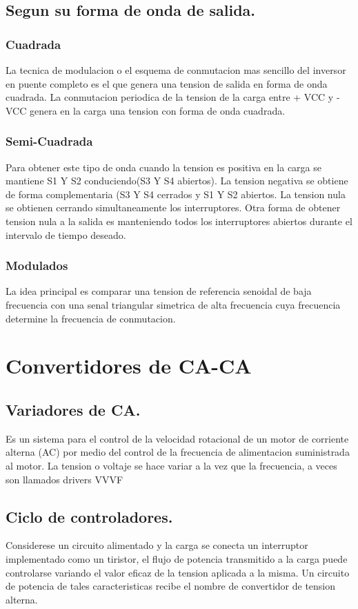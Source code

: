 \documentclass[11pt]{article}
\begin{document}
\subsection{Segun su forma de onda de salida.}
\subsubsection{Cuadrada}
La tecnica de modulacion o el esquema de conmutacion mas sencillo del inversor en puente
completo es el que genera una tension de salida en forma de onda cuadrada. La conmutacion
periodica de la tension de la carga entre + VCC y -VCC genera en la carga una tension con
forma de onda cuadrada.
\subsubsection{Semi-Cuadrada}
Para obtener este tipo de onda cuando la tension es positiva en la carga se mantiene S1
Y S2 conduciendo(S3 Y S4 abiertos). La tension negativa se obtiene de forma complementaria
(S3 Y S4 cerrados y S1 Y S2 abiertos. La tension nula se obtienen cerrando simultaneamente
los interruptores. Otra forma de obtener tension nula a la salida es manteniendo todos los
interruptores abiertos durante el intervalo de tiempo deseado.
\subsubsection{Modulados}
La idea principal es comparar una tension de referencia senoidal de baja frecuencia con
una senal triangular simetrica de alta frecuencia cuya frecuencia determine la frecuencia de
conmutacion.
\section{Convertidores de CA-CA}

\subsection{Variadores de CA.}
Es un sistema para el control de la velocidad rotacional de un motor de corriente alterna
(AC) por medio del control de la frecuencia de alimentacion suministrada al motor. La tension
o voltaje se hace variar a la vez que la frecuencia, a veces son llamados drivers VVVF
\subsection{Ciclo de controladores.}
Considerese un circuito alimentado y la carga se conecta un interruptor implementado como
un tiristor, el flujo de potencia transmitido a la carga puede controlarse variando el valor eficaz
de la tension aplicada a la misma. Un circuito de potencia de tales caracteristicas recibe el
nombre de convertidor de tension alterna.
\end{document}
